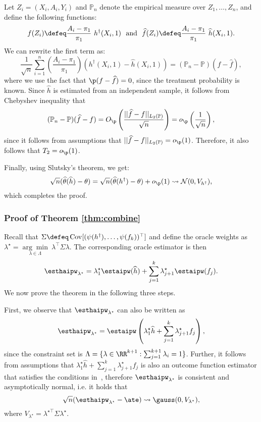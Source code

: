 Let $Z_i = (X_i,A_i,Y_i)$ and $\mathbb{P}_n$ denote the empirical measure over $Z_1, \dots, Z_n$, and define the following functions:
 $$f(Z_i) \defeq \frac{A_i-\pi_1}{\pi_1}~h^\dagger(X_i,1)~~\text{and}~~\widehat{f}(Z_i) \defeq \frac{A_i-\pi_1}{\pi_1}~\widehat{h}(X_i,1).$$ We can rewrite the first term as:
$$\frac{1}{\sqrt{n}} \sum_{i=1}^n \left(\frac{A_i-\pi_1}{\pi_1}\right) (h^\dagger(X_i,1) - \widehat{h}(X_i,1)) = (\mathbb{P}_n - \mathbb{P})(f - \widehat{f}),$$
where we use the fact that $\p(f-\widehat f)=0$, since the treatment probability is known. Since $\widehat h$ is estimated from an independent sample, it follows from Chebyshev inequality that
    $$(\mathbb{P}_n - \mathbb{P})(\widehat{f} - f) = O_{\p}\left(\frac{||\widehat{f} - f||_{L_2(\mathbb P)}}{\sqrt{n}}\right) = o_{\p}\left(\frac{1}{\sqrt n}\right ),$$
since it follows from assumptions that $||\widehat{f} - f||_{L_2(\mathbb P)} = o_{\p}(1)$. Therefore, it also follows that $T_2 = o_{\p}(1)$. 


Finally, using Slutsky's theorem, we get:
$$\sqrt{n}(\widehat{\theta}(\widehat{h}) - \theta) = \sqrt{n}(\widehat{\theta}(h^\dagger) - \theta) + o_{\p}(1) \rightsquigarrow \mathcal{N}(0, V_{h^\dagger}),$$
which completes the proof.

\subsubsection{Proof of Theorem \ref{thm:combine}}
\label{apx:proofhaipw}
Recall that $\Sigma \defeq \operatorname{Cov}[ (\psi( h^\dagger), \ldots, \psi(f_k))^\top]$ and  define the oracle weights as $\lambda^\star = \underset{\lambda \in \Lambda}{\arg\min}~ \lambda^\top \Sigma \lambda$. The corresponding oracle estimator is then   $$
\esthaipw_{\lambda^\star} = \lambda^\star_1 \estaipw(\widehat h) + \sum_{j=1}^k \lambda^\star_{j+1} \estaipw(f_j).$$ We now prove the theorem in the following three steps.

First,  we observe that $\esthaipw_{\lambda^\star}$ can also be written as $$ \esthaipw_{\lambda^\star} = \estaipw\left(\lambda^\star_1\widehat h+ \sum_{j=1}^k \lambda^\star_{j+1} f_j\right),$$ since the constraint set is $\Lambda = \{\lambda \in \RR^{k+1}: \sum_{j=1}^{k+1} \lambda_i =1\}$. Further, it follows from assumptions that $\lambda^\star_1\widehat h+ \sum_{j=1}^k \lambda^\star_{j+1} f_j$ is also an outcome function estimator that satisfies the conditions in~, therefore  $\esthaipw_{\lambda^\star}$ is consistent and asymptotically normal, i.e. it holds that
$$
\sqrt n (\esthaipw_{ \lambda^\star}   - \ate) \rightsquigarrow \gauss(0, V_{\lambda^\star}),
$$
where $V_{\lambda^\star} = \lambda^{\star \top} \Sigma \lambda^\star.$



